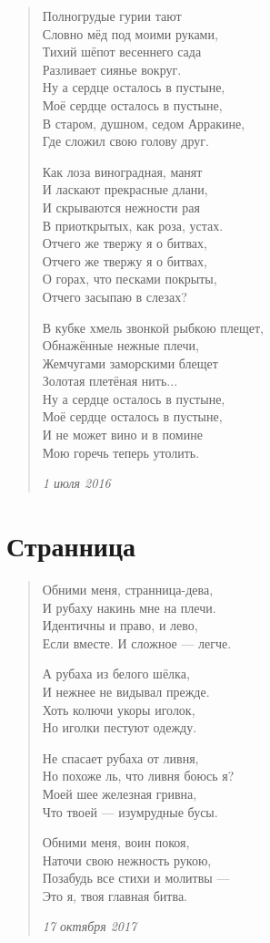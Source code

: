 \documentclass[a4paper,12pt,fleqn]{book}\usepackage{polyglossia}\setdefaultlanguage[babelshorthands=true]{russian}\setotherlanguage{english}\defaultfontfeatures{Ligatures=TeX,Mapping=tex-text}\usepackage{xcolor}\newcommand{\ml}[3]{#2}
\begin{document}
\begin{verse}
Полногрудые гурии тают\\
Словно мёд под моими руками,\\
Тихий шёпот весеннего сада\\
Разливает сиянье вокруг.\\
Ну а сердце осталось в пустыне,\\
Моё сердце осталось в пустыне,\\
В старом, душном, седом Арракине,\\
Где сложил свою голову друг.

Как лоза виноградная, манят\\
И ласкают прекрасные длани,\\
И скрываются нежности рая\\
В приоткрытых, как роза, устах.\\
Отчего же твержу я о битвах,\\
Отчего же твержу я о битвах,\\
О горах, что песками покрыты,\\
Отчего засыпаю в слезах?

В кубке хмель звонкой рыбкою плещет,\\
Обнажённые нежные плечи,\\
Жемчугами заморскими блещет\\
Золотая плетёная нить...\\
Ну а сердце осталось в пустыне,\\
Моё сердце осталось в пустыне,\\
И не может вино и в помине\\
Мою горечь теперь утолить.

\emph{1 июля 2016}
\end{verse}
\newpage

\section{Странница}

\begin{verse}
 Обними меня, странница-дева,\\
И рубаху накинь мне на плечи.\\
Идентичны и право, и лево,\\
Если вместе. И сложное --- легче.

А рубаха из белого шёлка,\\
И нежнее не видывал прежде.\\
Хоть колючи укоры иголок,\\
Но иголки пестуют одежду.

Не спасает рубаха от ливня,\\
Но похоже ль, что ливня боюсь я?\\
Моей шее железная гривна,\\
Что твоей --- изумрудные бусы.

Обними меня, воин покоя,\\
Наточи свою нежность рукою,\\
Позабудь все стихи и молитвы ---\\
Это я, твоя главная битва.

\emph{17 октября 2017}
\end{verse}
\newpage
\end{document}
